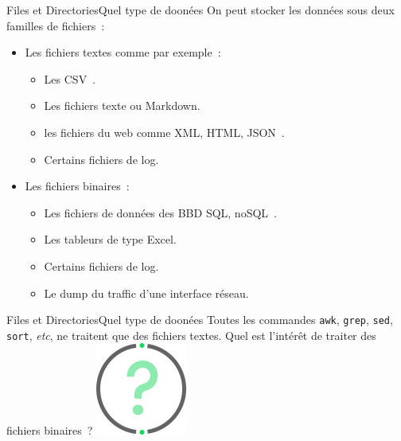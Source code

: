 \documentclass{beamer}
\begin{document}
    \begin{frame}[fragile]{Files et Directories}{Quel type de doonées}
        On peut stocker les données sous deux familles de fichiers~:
        \begin{itemize}
            \item Les fichiers textes comme par exemple~:
            \begin{itemize}
                \item Les CSV~.
                \item Les fichiers texte ou Markdown.
                \item les fichiers du web comme XML, HTML, JSON~.
                \item Certains fichiers de log.
            \end{itemize}
            \item Les fichiers binaires~:
            \begin{itemize}
                \item Les fichiers de données des BBD SQL, noSQL~.
                \item Les tableurs de type Excel.
                \item Certains fichiers de log.
                \item Le dump du traffic d'une interface réseau.
            \end{itemize}
        \end{itemize}
    \end{frame}

    \begin{frame}{Files et Directories}{Quel type de doonées}
        Toutes les commandes \lstinline{awk}, \lstinline{grep}, \lstinline{sed}, \lstinline{sort}, \textit{etc}, ne traitent que des fichiers textes.
        \bigbreak
        Quel est l'intérêt de traiter des fichiers binaires~?
        \bigbreak
        \centering
        \includegraphics[width=3cm]{image/question-mark}
    \end{frame}
\end{document}
